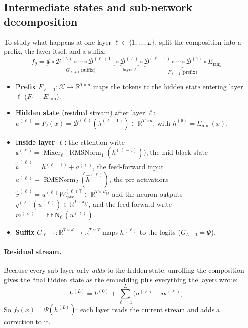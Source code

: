 \documentclass[10pt,a4paper]{article}
\newcommand{\op}[1]{\operatorname{#1}}
\theoremstyle{definition}
\begin{document}
\subsection{Intermediate states and sub-network decomposition}
To study what happens at one layer $\ell\in\{1,\dots,L\}$, split the composition into a prefix, the layer itself and a suffix:
\begin{equation}
  f_\theta = \underbrace{\Psi\circ\mathcal{B}^{(L)}\circ\cdots\circ\mathcal{B}^{(\ell+1)}}_{G_{\ell+1}\ \text{(suffix)}}\circ\underbrace{\mathcal{B}^{(\ell)}}_{\text{layer }\ell}\circ\underbrace{\mathcal{B}^{(\ell-1)}\circ\cdots\circ\mathcal{B}^{(1)}\circ E_{\mathrm{mm}}}_{F_{\ell-1}\ \text{(prefix)}}
\end{equation}
\begin{itemize}
\item \textbf{Prefix} $F_{\ell-1}:\mathcal{X}\to\mathbb{R}^{T\times d}$ maps the tokens to the hidden state entering layer $\ell$ ($F_0=E_{\mathrm{mm}}$).
\item \textbf{Hidden state} (residual stream) after layer $\ell$: $h^{(\ell)}=F_\ell(x)=\mathcal{B}^{(\ell)}(h^{(\ell-1)})\in\mathbb{R}^{T\times d}$, with $h^{(0)}=E_{\mathrm{mm}}(x)$.
\item \textbf{Inside layer $\ell$:} the attention write $a^{(\ell)}=\op{Mixer}_\ell\big(\op{RMSNorm}_{1}(h^{(\ell-1)})\big)$, the mid-block state $\hat h^{(\ell)}=h^{(\ell-1)}+a^{(\ell)}$, the feed-forward input $u^{(\ell)}=\op{RMSNorm}_{2}(\hat h^{(\ell)})$, the pre-activations $\hat x^{(\ell)}=u^{(\ell)}W^{(\ell)\top}_{\mathrm{gate}}\in\mathbb{R}^{T\times d_{ff}}$ and the neuron outputs $\eta^{(\ell)}(u^{(\ell)})\in\mathbb{R}^{T\times d_{ff}}$, and the feed-forward write $m^{(\ell)}=\op{FFN}_\ell(u^{(\ell)})$.
\item \textbf{Suffix} $G_{\ell+1}:\mathbb{R}^{T\times d}\to\mathbb{R}^{T\times V}$ maps $h^{(\ell)}$ to the logits ($G_{L+1}=\Psi$).
\end{itemize}
\paragraph{Residual stream.} Because every sub-layer only \emph{adds} to the hidden state, unrolling the composition gives the final hidden state as the embedding plus everything the layers wrote:
\begin{equation}
  h^{(L)} = h^{(0)} + \sum_{\ell=1}^{L}\big(a^{(\ell)}+m^{(\ell)}\big)
\end{equation}
So $f_\theta(x)=\Psi(h^{(L)})$: each layer reads the current stream and adds a correction to it.
\end{document}
